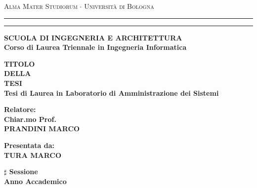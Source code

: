 \documentclass[12pt,a4paper]{report}
\begin{document}
\begin{titlepage}
\begin{center}
{{\Large{\textsc{Alma Mater Studiorum $\cdot$ Universit\`a di
Bologna}}}} \rule[0.1cm]{15.8cm}{0.1mm}
\rule[0.5cm]{15.8cm}{0.6mm}
{\small{\bf SCUOLA DI INGEGNERIA E ARCHITETTURA\\
Corso di Laurea Triennale in Ingegneria Informatica}}
\end{center}
\vspace{15mm}
\begin{center}
{\LARGE{\bf TITOLO}}\\
\vspace{3mm}
{\LARGE{\bf DELLA}}\\
\vspace{3mm}
{\LARGE{\bf TESI}}\\
\vspace{19mm} {\large{\bf Tesi di Laurea in Laboratorio di Amministrazione  dei Sistemi}}
\end{center}
\vspace{40mm}
\par
\noindent
\begin{minipage}[t]{0.47\textwidth}
{\large{\bf Relatore:\\
Chiar.mo Prof.\\
PRANDINI MARCO}}
\end{minipage}
\hfill
\begin{minipage}[t]{0.47\textwidth}\raggedleft
{\large{\bf Presentata da:\\
TURA MARCO}}
\end{minipage}
\vspace{20mm}
\begin{center}
{\large{\bf $\sharp$ Sessione\\
Anno Accademico }}
\end{center}
\end{titlepage}
\end{document}
